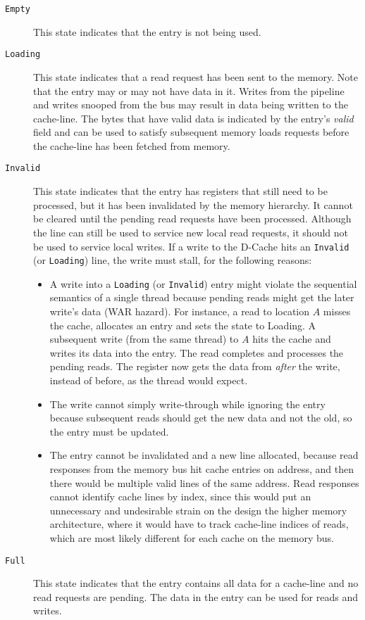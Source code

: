 \begin{description}
\item[{\tt Empty}]
This state indicates that the entry is not being used.

\item[{\tt Loading}]
This state indicates that a read request has been sent to the memory. Note that the entry may or may not have data in it. Writes from the pipeline and writes snooped from the bus may result in data being written to the cache-line. The bytes that have valid data is indicated by the entry's \emph{valid} field and can be used to satisfy subsequent memory loads requests before the cache-line has been fetched from memory. 

\item[{\tt Invalid}]
This state indicates that the entry has registers that still need to be processed, but it has been invalidated by the memory hierarchy. It cannot be cleared until the pending read requests have been processed. Although the line can still be used to service new local read requests, it should not be used to service local writes. If a write to the D-Cache hits an {\tt Invalid} (or {\tt Loading}) line, the write must stall, for the following reasons:
\begin{itemize}
  \item A write into a {\tt Loading} (or {\tt Invalid}) entry might violate the sequential semantics of a single thread because pending reads might get the later write's data (WAR hazard). For instance, a read to location $A$ misses the cache, allocates an entry and sets the state to Loading. A subsequent write (from the same thread) to $A$ hits the cache and writes its data into the entry. The read completes and processes the pending reads. The register now gets the data from \emph{after} the write, instead of before, as the thread would expect.
  \item The write cannot simply write-through while ignoring the entry because subsequent reads should get the new data and not the old, so the entry must be updated.
  \item The entry cannot be invalidated and a new line allocated, because read responses from the memory bus hit cache entries on address, and then there would be multiple valid lines of the same address. Read responses cannot identify cache lines by index, since this would put an unnecessary and undesirable strain on the design the higher memory architecture, where it would have to track cache-line indices of reads, which are most likely different for each cache on the memory bus.
\end{itemize}

\item[{\tt Full}]
This state indicates that the entry contains all data for a cache-line and no read requests are pending. The data in the entry can be used for reads and writes.
\end{description}

